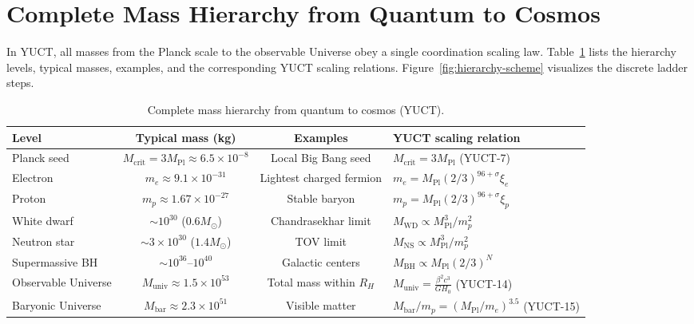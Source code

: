\documentclass[12pt,a4paper]{article}
\newcommand{\betaf}{\beta}
\begin{document}
	\section{Complete Mass Hierarchy from Quantum to Cosmos}
	
	In YUCT, all masses from the Planck scale to the observable Universe obey a single coordination scaling law. Table~\ref{tab:full-hierarchy} lists the hierarchy levels, typical masses, examples, and the corresponding YUCT scaling relations. Figure~\ref{fig:hierarchy-scheme} visualizes the discrete ladder steps.
	
	\begin{table}[htbp]
		\centering
		\caption{Complete mass hierarchy from quantum to cosmos (YUCT).}
		\label{tab:full-hierarchy}
		\small
		\begin{tabular}{l c c l}
			\toprule
			\textbf{Level} & \textbf{Typical mass (kg)} & \textbf{Examples} & \textbf{YUCT scaling relation} \\
			\midrule
			Planck seed & \(M_{\mathrm{crit}} = 3M_{\mathrm{Pl}} \approx 6.5\times10^{-8}\) & Local Big Bang seed & \(M_{\mathrm{crit}} = 3 M_{\mathrm{Pl}}\) (YUCT-7) \\
			Electron & \(m_e \approx 9.1\times10^{-31}\) & Lightest charged fermion & \(m_e = M_{\mathrm{Pl}} (2/3)^{96+\sigma}\xi_e\) \\
			Proton & \(m_p \approx 1.67\times10^{-27}\) & Stable baryon & \(m_p = M_{\mathrm{Pl}} (2/3)^{96+\sigma}\xi_p\) \\
			White dwarf & \(\sim 10^{30}\) (\(0.6M_\odot\)) & Chandrasekhar limit & \(M_{\mathrm{WD}} \propto M_{\mathrm{Pl}}^{3}/m_p^2\) \\
			Neutron star & \(\sim 3\times10^{30}\) (\(1.4M_\odot\)) & TOV limit & \(M_{\mathrm{NS}} \propto M_{\mathrm{Pl}}^{3}/m_p^2\) \\
			Supermassive BH & \(\sim 10^{36}\)–\(10^{40}\) & Galactic centers & \(M_{\mathrm{BH}} \propto M_{\mathrm{Pl}} (2/3)^{N}\) \\
			Observable Universe & \(M_{\mathrm{univ}} \approx 1.5\times10^{53}\) & Total mass within \(R_H\) & \(M_{\mathrm{univ}} = \frac{\betaf^2 c^3}{G H_0}\) (YUCT-14) \\
			Baryonic Universe & \(M_{\mathrm{bar}} \approx 2.3\times10^{51}\) & Visible matter & \(M_{\mathrm{bar}}/m_p = (M_{\mathrm{Pl}}/m_e)^{3.5}\) (YUCT-15) \\
			\bottomrule
		\end{tabular}
	\end{table}
	
\end{document}
